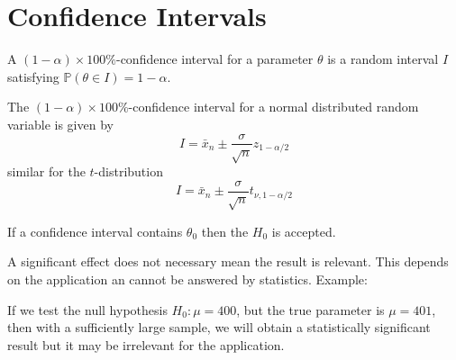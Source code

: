 \section{Confidence Intervals}

A $(1-\alpha)\times 100\%$-confidence interval for a parameter $\theta$ is a random interval $I$ satisfying $\mathbb{P}(\theta\in I)=1-\alpha$.

The $(1-\alpha)\times 100\%$-confidence interval for a normal distributed random variable is given by
\begin{equation*}
    I=\bar{x}_n \pm \frac{\sigma}{\sqrt{n}}z_{1-\alpha/2}
\end{equation*}
similar for the $t$-distribution
\begin{equation*}
    I=\bar{x}_n \pm \frac{\sigma}{\sqrt{n}}t_{\nu,1-\alpha/2}
\end{equation*}

\newpar{}

If a confidence interval contains $\theta_0$ then the $H_0$ is accepted.

\newpar{}

A significant effect does not necessary mean the result is relevant. This depends on the application an cannot be answered by statistics.
\newpar{}
Example:

If we test the null hypothesis $H_0:\mu=400$, but the true parameter is $\mu=401$, then with a sufficiently large sample, we will obtain a statistically significant result but it may be irrelevant for the application.